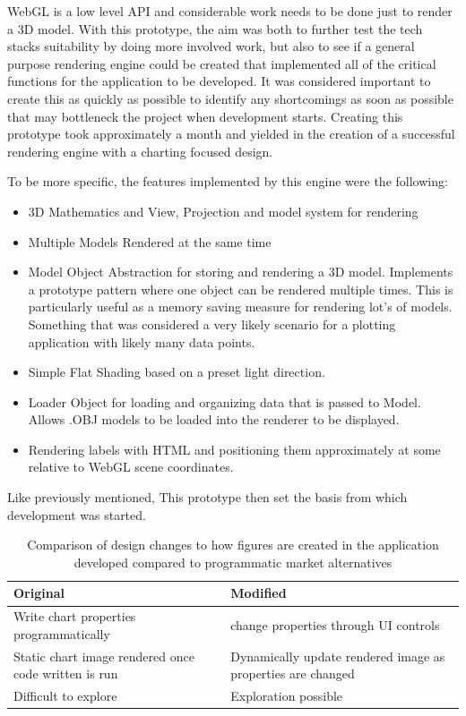 \hfill

WebGL is a low level API and considerable work needs to be done just to render a 3D model. With this prototype, the aim was both to further test the tech stacks suitability by doing more involved work, but also to see if a general purpose rendering engine could be created that implemented all of the critical functions for the application to be developed. It was considered important to create this as quickly as possible to identify any shortcomings as soon as possible that may bottleneck the project when development starts. Creating this prototype took approximately a month and yielded in the creation of a successful rendering engine with a charting focused design.

To be more specific, the features implemented by this engine were the following:
\begin{itemize}
    \item 3D Mathematics and View, Projection and model system for rendering
    \item Multiple Models Rendered at the same time
    \item Model Object Abstraction for storing and rendering a 3D model. Implements a prototype pattern where one object can be rendered multiple times. This is particularly useful as a memory saving measure for rendering lot's of models. Something that was considered a very likely scenario for a plotting application with likely many data points.
    \item Simple Flat Shading based on a preset light direction.
    \item Loader Object for loading and organizing data that is passed to Model. Allows .OBJ models to be loaded into the renderer to be displayed.
    \item Rendering labels with HTML and positioning them approximately at some relative to WebGL scene coordinates.
\end{itemize}

Like previously mentioned, This prototype then set the basis from which development was started.

\begin{table}[t]
    \begin{tabular}{ | l | l | }
        \hline
        Original                                             & Modified                                                    \\
        \hline
        Write chart properties programmatically              & change properties through UI controls                       \\
        \hline
        Static chart image rendered once code written is run & Dynamically update rendered image as properties are changed \\
        \hline
        Difficult to explore                                 & Exploration possible                                        \\
        \hline
    \end{tabular}
    \caption{Comparison of design changes to how figures are created in the application developed compared to programmatic market alternatives}
    \label{}
\end{table}

